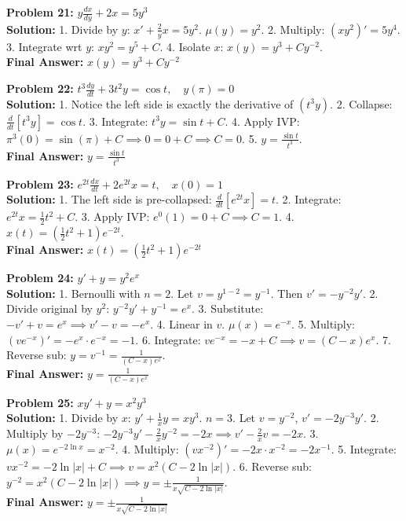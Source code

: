 \documentclass[11pt]{article}
\begin{document}
\vspace{10pt}
\textbf{Problem 21:} $y \frac{dx}{dy} + 2x = 5y^3$ \\
\textbf{Solution:} 
1. Divide by $y$: $x' + \frac{2}{y}x = 5y^2$. $\mu(y) = y^2$. 
2. Multiply: $(xy^2)' = 5y^4$. 
3. Integrate wrt $y$: $xy^2 = y^5 + C$. 
4. Isolate $x$: $x(y) = y^3 + Cy^{-2}$. \\
\textbf{Final Answer:} $x(y) = y^3 + Cy^{-2}$

\vspace{10pt}
\textbf{Problem 22:} $t^3 \frac{dy}{dt} + 3t^2 y = \cos t, \quad y(\pi) = 0$ \\
\textbf{Solution:} 
1. Notice the left side is exactly the derivative of $(t^3 y)$. 
2. Collapse: $\frac{d}{dt}[t^3 y] = \cos t$. 
3. Integrate: $t^3 y = \sin t + C$. 
4. Apply IVP: $\pi^3(0) = \sin(\pi) + C \implies 0 = 0 + C \implies C = 0$. 
5. $y = \frac{\sin t}{t^3}$. \\
\textbf{Final Answer:} $y = \frac{\sin t}{t^3}$

\vspace{10pt}
\textbf{Problem 23:} $e^{2t} \frac{dx}{dt} + 2e^{2t} x = t, \quad x(0) = 1$ \\
\textbf{Solution:} 
1. The left side is pre-collapsed: $\frac{d}{dt}[e^{2t} x] = t$. 
2. Integrate: $e^{2t} x = \frac{1}{2}t^2 + C$. 
3. Apply IVP: $e^0 (1) = 0 + C \implies C = 1$. 
4. $x(t) = (\frac{1}{2}t^2 + 1)e^{-2t}$. \\
\textbf{Final Answer:} $x(t) = (\frac{1}{2}t^2 + 1)e^{-2t}$

\vspace{10pt}
\textbf{Problem 24:} $y' + y = y^2 e^x$ \\
\textbf{Solution:} 
1. Bernoulli with $n=2$. Let $v = y^{1-2} = y^{-1}$. Then $v' = -y^{-2}y'$. 
2. Divide original by $y^2$: $y^{-2}y' + y^{-1} = e^x$. 
3. Substitute: $-v' + v = e^x \implies v' - v = -e^x$. 
4. Linear in $v$. $\mu(x) = e^{-x}$. 
5. Multiply: $(ve^{-x})' = -e^x \cdot e^{-x} = -1$. 
6. Integrate: $v e^{-x} = -x + C \implies v = (C - x)e^x$. 
7. Reverse sub: $y = v^{-1} = \frac{1}{(C - x)e^x}$. \\
\textbf{Final Answer:} $y = \frac{1}{(C - x)e^x}$

\vspace{10pt}
\textbf{Problem 25:} $x y' + y = x^2 y^3$ \\
\textbf{Solution:} 
1. Divide by $x$: $y' + \frac{1}{x}y = x y^3$. $n=3$. Let $v = y^{-2}$, $v' = -2y^{-3}y'$. 
2. Multiply by $-2y^{-3}$: $-2y^{-3}y' - \frac{2}{x}y^{-2} = -2x \implies v' - \frac{2}{x}v = -2x$. 
3. $\mu(x) = e^{-2\ln x} = x^{-2}$. 
4. Multiply: $(vx^{-2})' = -2x \cdot x^{-2} = -2x^{-1}$. 
5. Integrate: $vx^{-2} = -2\ln|x| + C \implies v = x^2(C - 2\ln|x|)$. 
6. Reverse sub: $y^{-2} = x^2(C - 2\ln|x|) \implies y = \pm \frac{1}{x\sqrt{C - 2\ln|x|}}$. \\
\textbf{Final Answer:} $y = \pm \frac{1}{x\sqrt{C - 2\ln|x|}}$
\end{document}
